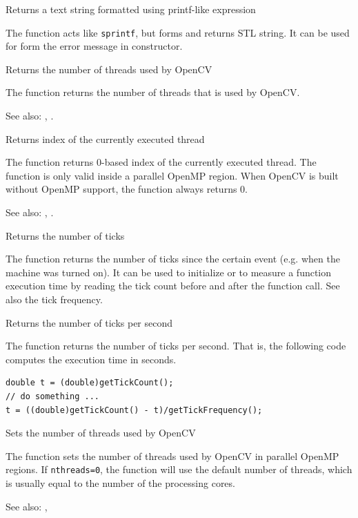 Returns a text string formatted using printf-like expression

\begin{description}
\end{description}

The function acts like \texttt{sprintf}, but forms and returns STL string. It can be used for form the error message in  constructor.

Returns the number of threads used by OpenCV


The function returns the number of threads that is used by OpenCV.

See also: , .


Returns index of the currently executed thread


The function returns 0-based index of the currently executed thread. The function is only valid inside a parallel OpenMP region. When OpenCV is built without OpenMP support, the function always returns 0.

See also: , .

Returns the number of ticks


The function returns the number of ticks since the certain event (e.g. when the machine was turned on).
It can be used to initialize  or to measure a function execution time by reading the tick count before and after the function call. See also the tick frequency.

Returns the number of ticks per second


The function returns the number of ticks per second.
That is, the following code computes the execution time in seconds.
\begin{lstlisting}
double t = (double)getTickCount();
// do something ...
t = ((double)getTickCount() - t)/getTickFrequency();
\end{lstlisting}

Sets the number of threads used by OpenCV

\begin{description}
\end{description}

The function sets the number of threads used by OpenCV in parallel OpenMP regions. If \texttt{nthreads=0}, the function will use the default number of threads, which is usually equal to the number of the processing cores.

See also: , 

\fi
